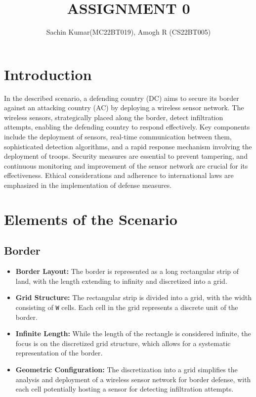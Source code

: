 \documentclass[12pt,a4paper]{article}
\title{\textbf{ASSIGNMENT 0}}
\author{Sachin Kumar(MC22BT019), Amogh R (CS22BT005)}
\date{}
\begin{document}
\maketitle

\section{Introduction}\label{sec:intro}
In the described scenario, a defending country (DC) aims to secure its border against an attacking country (AC) by deploying a wireless sensor network. The wireless sensors, strategically placed along the border, detect infiltration attempts, enabling the defending country to respond effectively. Key components include the deployment of sensors, real-time communication between them, sophisticated detection algorithms, and a rapid response mechanism involving the deployment of troops. Security measures are essential to prevent tampering, and continuous monitoring and improvement of the sensor network are crucial for its effectiveness. Ethical considerations and adherence to international laws are emphasized in the implementation of defense measures.

\section{Elements of the Scenario}\label{sec:methods}
\subsection{Border}
\begin{itemize}
    \item \textbf{Border Layout:} The border is represented as a long rectangular strip of land, with the length extending to infinity and discretized into a grid.

    \item \textbf{Grid Structure:} The rectangular strip is divided into a grid, with the width consisting of \texttt{W} cells. Each cell in the grid represents a discrete unit of the border.

    \item \textbf{Infinite Length:} While the length of the rectangle is considered infinite, the focus is on the discretized grid structure, which allows for a systematic representation of the border.

    \item \textbf{Geometric Configuration:} The discretization into a grid simplifies the analysis and deployment of a wireless sensor network for border defense, with each cell potentially hosting a sensor for detecting infiltration attempts.
    
\end{itemize}
\end{document}
